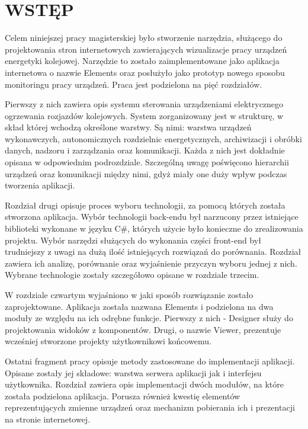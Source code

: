 \chapter*{WSTĘP}

Celem niniejszej pracy magisterskiej było stworzenie narzędzia, służącego do projektowania stron internetowych zawierających wizualizacje pracy urządzeń energetyki kolejowej. Narzędzie to zostało zaimplementowane jako aplikacja internetowa o nazwie Elements oraz posłużyło jako prototyp nowego sposobu monitoringu pracy urządzeń. Praca jest podzielona na pięć rozdziałów.

Pierwszy z nich zawiera opis systemu sterowania urządzeniami elektrycznego ogrzewania rozjazdów kolejowych. System zorganizowany jest w strukturę, w skład której wchodzą określone warstwy. Są nimi: warstwa urządzeń wykonawczych, autonomicznych rozdzielnic energetycznych, archiwizacji i obróbki danych, nadzoru i zarządzania oraz komunikacji. Każda z nich jest dokładnie opisana w odpowiednim podrozdziale. Szczególną uwagę poświęcono hierarchii urządzeń oraz komunikacji między nimi, gdyż miały one duży wpływ podczas tworzenia aplikacji.

Rozdział drugi opisuje proces wyboru technologii, za pomocą których została stworzona aplikacja. Wybór technologii back-endu był narzucony przez istniejące biblioteki wykonane w języku C\#, których użycie było konieczne do zrealizowania projektu. Wybór narzędzi służących do wykonania części front-end był trudniejszy z uwagi na dużą ilość istniejących rozwiązań do porównania. Rozdział zawiera ich analizę, porównanie oraz wyjaśnienie przyczyn wyboru jednej z nich. Wybrane technologie zostały szczegółowo opisane w rozdziale trzecim.

W rozdziale czwartym wyjaśniono w jaki sposób rozwiązanie zostało zaprojektowane. Aplikacja została nazwana Elements i podzielona na dwa moduły ze względu na ich odrębne funkcje. Pierwszy z nich - Designer służy do projektowania widoków z komponentów. Drugi, o nazwie Viewer, prezentuje wcześniej stworzone projekty użytkownikowi końcowemu.

Ostatni fragment pracy opisuje metody zastosowane do implementacji aplikacji. Opisane zostały jej składowe: warstwa serwera aplikacji jak i interfejsu użytkownika. Rozdział zawiera opis implementacji dwóch modułów, na które została podzielona aplikacja. Porusza również kwestię elementów reprezentujących zmienne urządzeń oraz mechanizm pobierania ich i prezentacji na stronie internetowej.
